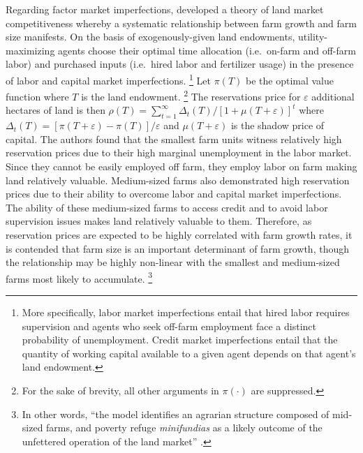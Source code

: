 \documentclass[english]{article}
\begin{document}
Regarding factor market imperfections, \citet{carter1993} developed a theory 
of land market competitiveness whereby a systematic relationship between 
farm growth and farm size manifests.
On the basis of exogenously-given land endowments, utility-maximizing 
agents choose their optimal time allocation 
(i.e.\ on-farm and off-farm labor) and purchased inputs 
(i.e.\ hired labor and fertilizer usage) in the presence of labor and 
capital market imperfections.%
\footnote{More specifically, labor market imperfections entail that hired 
labor requires supervision and agents who seek off-farm employment face a 
distinct probability of unemployment. 
Credit market imperfections entail that the quantity of working capital 
available to a given agent depends on that agent's land endowment.}
Let $\pi(T)$ be the optimal value function where $T$ is the land endowment.%
\footnote{For the sake of brevity, all other arguments in $\pi(\cdot)$ are 
suppressed.}
The reservations price for $\varepsilon$ additional hectares of land is then 
$\rho(T) = \sum_{t=1}^{\infty} \Delta_t(T)/[1 + \mu(T + \varepsilon)]^t$
where $\Delta_t(T) = [\pi(T + \varepsilon) - \pi(T)]/\varepsilon $ and 
$\mu(T + \varepsilon)$ is the shadow price of capital.
The authors found that the smallest farm units witness relatively high 
reservation prices due to their high marginal unemployment in the labor 
market. 
Since they cannot be easily employed off farm, they employ labor on farm 
making land relatively valuable.
Medium-sized farms also demonstrated high reservation prices due to
their ability to overcome labor and capital market imperfections. 
The ability of these medium-sized farms to access credit and to avoid labor 
supervision issues makes land relatively valuable to them.
Therefore, as reservation prices are expected to be highly correlated with farm 
growth rates, it is contended that farm size is an important determinant of 
farm growth, though the relationship may be highly non-linear with the 
smallest and medium-sized farms most likely to accumulate.%
\footnote{In other words, ``the model identifies an agrarian structure 
composed of mid-sized farms, and poverty refuge \emph{minifundias} as a 
likely outcome of the unfettered operation of the land market'' 
\citep[pg.\ 1097]{carter1993}.}
\end{document}
